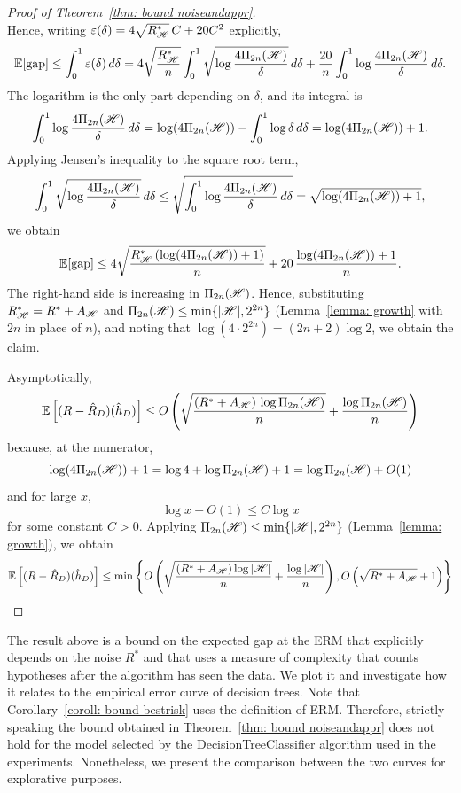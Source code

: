 \documentclass[reqno]{amsart}
\begin{document}
\begin{theorem}
\begin{proof}[Proof of Theorem~\ref{thm: bound noiseandappr}]
\[\]
Hence, writing $\varepsilon(\delta) = 4\sqrt{R^*_{\mathscr{H}}}\,C + 20C^2$ explicitly,
\[
\mathbb{E}[\text{gap}] \le \int_0^1 \varepsilon(\delta)\,d\delta = 4\sqrt{\frac{R^*_{\mathscr{H}}}{n}}\int_0^1 \sqrt{\log\frac{4\Pi_{2n}(\mathscr{H})}{\delta}}\,d\delta + \frac{20}{n}\int_0^1 \log\frac{4\Pi_{2n}(\mathscr{H})}{\delta}\,d\delta.
\]
The logarithm is the only part depending on $\delta$, and its integral is
\[
\int_0^1 \log\frac{4\Pi_{2n}(\mathscr{H})}{\delta}\,d\delta = \log(4\Pi_{2n}(\mathscr{H})) - \int_0^1 \log\delta\,d\delta = \log(4\Pi_{2n}(\mathscr{H})) + 1.
\]
Applying Jensen's inequality to the square root term,
\[
\int_0^1 \sqrt{\log\frac{4\Pi_{2n}(\mathscr{H})}{\delta}}\,d\delta \le \sqrt{\int_0^1 \log\frac{4\Pi_{2n}(\mathscr{H})}{\delta}\,d\delta} = \sqrt{\log(4\Pi_{2n}(\mathscr{H})) + 1},
\]
we obtain
\[
\mathbb{E}[\text{gap}] \le 4\sqrt{\frac{R^*_{\mathscr{H}}\left(\log(4\Pi_{2n}(\mathscr{H})) + 1\right)}{n}} + 20\,\frac{\log(4\Pi_{2n}(\mathscr{H})) + 1}{n}.
\]
The right-hand side is increasing in $\Pi_{2n}(\mathscr{H})$. Hence, substituting $R^*_{\mathscr{H}} = R^*+A_{\mathscr{H}}$ and $\Pi_{2n}(\mathscr{H})\le\min\{\vert\mathscr{H}\vert,2^{2n}\}$ (Lemma~\ref{lemma: growth} with $2n$ in place of $n$), and noting that $\log(4\cdot 2^{2n}) = (2n+2)\log 2$, we obtain the claim.

Asymptotically,
\[
\mathbb{E}\left[(R-\hat R_D)(\hat h_D)\right] \le O\left(
\sqrt{\frac{(R^*+A_{\mathscr{H}})\,\log \Pi_{2n}(\mathscr{H})}{n}} + \frac{\log \Pi_{2n}(\mathscr{H})}{n} \right)
\]
because, at the numerator,
\[
\log (4 \Pi_{2n}(\mathscr{H})) + 1 = \log 4 + \log \Pi_{2n}(\mathscr{H}) + 1 = \log \Pi_{2n}(\mathscr{H}) + O(1)
\]
and for large $x$, 
\[
\log x + O(1) \le C \log x
\] 
for some constant $C>0$.
Applying $\Pi_{2n}(\mathscr{H})\le\min\{\vert\mathscr{H}\vert,2^{2n}\}$ (Lemma~\ref{lemma: growth}), we obtain
\[
\mathbb{E}\left[(R-\hat R_D)(\hat h_D)\right] \le \min\left\{ O\left(
\sqrt{\frac{(R^*+A_{\mathscr{H}})\log \vert\mathscr{H}\vert}{n}} + \frac{\log\vert\mathscr{H}\vert}{n} \right), O\left(\sqrt{R^*+A_{\mathscr{H}}}+1 \right)\right\}
\]
\end{proof}
\end{theorem}

The result above is a bound on the expected gap at the ERM that explicitly depends on the noise $R^*$ and that uses a measure of complexity that counts hypotheses after the algorithm has seen the data. 
We plot it and investigate how it relates to the empirical error curve of decision trees. Note that Corollary~\ref{coroll: bound bestrisk} uses the definition of ERM. Therefore, strictly speaking the bound obtained in Theorem~\ref{thm: bound noiseandappr} does not hold for the model selected by the DecisionTreeClassifier algorithm used in the experiments. Nonetheless, we present the comparison between the two curves for explorative purposes.
\end{document}
